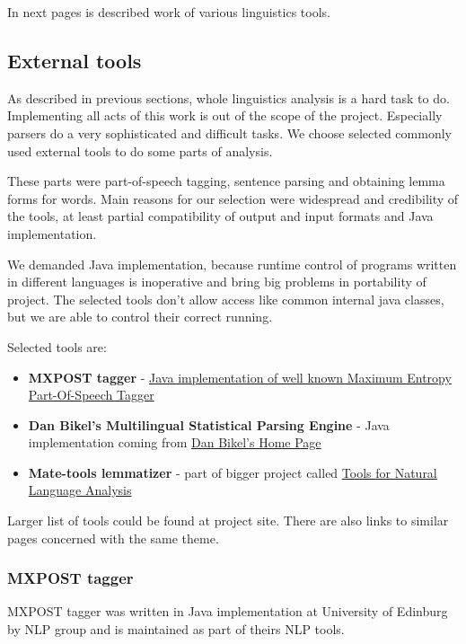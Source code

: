 In next pages is described work of various linguistics tools.

\subsection{External tools}
\label{sec:externaltools}
As described in previous sections, whole linguistics analysis is a hard task to do. Implementing all acts of this work is out of the scope of the project.  Especially parsers do a very sophisticated and difficult tasks. We choose selected commonly used external tools to do some parts of analysis. 

These parts were part-of-speech tagging, sentence parsing and obtaining lemma forms for words. Main reasons for our selection were widespread  and credibility of the tools, at least partial compatibility of output and input formats and Java implementation. 

We demanded Java implementation, because runtime control of programs written in different languages is inoperative and bring big problems in portability of project. The selected tools don't allow access like common internal java classes, but we are able to control their correct running.

Selected tools are:
 
\begin{itemize}
\item {\bf MXPOST tagger} - \href{http://www.inf.ed.ac.uk/resources/nlp/local_doc/MXPOST.html}{Java implementation of well known Maximum Entropy Part-Of-Speech Tagger}
\item {\bf Dan Bikel's Multilingual Statistical Parsing Engine } - Java implementation coming from \href{http://www.cis.upenn.edu/~dbikel/software.html#stat-parser}{Dan Bikel’s Home Page}
\item {\bf Mate-tools lemmatizer} - part of bigger project called \href{http://code.google.com/p/mate-tools/}{Tools for Natural Language Analysis}
\end{itemize}

Larger list of tools could be found at project site. There are also links to similar pages concerned with the same theme. 
          
\subsubsection{MXPOST tagger} 
MXPOST tagger was written in Java implementation at University of Edinburg by NLP group and is maintained as part of theirs NLP tools.
        
